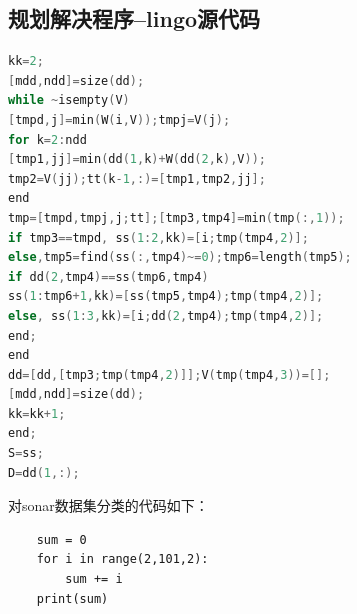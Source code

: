 \documentclass[fontset=windows]{whutmod}
\begin{document}
\subsection{规划解决程序--lingo源代码}
\begin{lstlisting}[language=c]
kk=2;
[mdd,ndd]=size(dd);
while ~isempty(V)
[tmpd,j]=min(W(i,V));tmpj=V(j);
for k=2:ndd
[tmp1,jj]=min(dd(1,k)+W(dd(2,k),V));
tmp2=V(jj);tt(k-1,:)=[tmp1,tmp2,jj];
end
tmp=[tmpd,tmpj,j;tt];[tmp3,tmp4]=min(tmp(:,1));
if tmp3==tmpd, ss(1:2,kk)=[i;tmp(tmp4,2)];
else,tmp5=find(ss(:,tmp4)~=0);tmp6=length(tmp5);
if dd(2,tmp4)==ss(tmp6,tmp4)
ss(1:tmp6+1,kk)=[ss(tmp5,tmp4);tmp(tmp4,2)];
else, ss(1:3,kk)=[i;dd(2,tmp4);tmp(tmp4,2)];
end;
end
dd=[dd,[tmp3;tmp(tmp4,2)]];V(tmp(tmp4,3))=[];
[mdd,ndd]=size(dd);
kk=kk+1;
end;
S=ss;
D=dd(1,:);
\end{lstlisting}


\lstset{language=python}

\noindent 对sonar数据集分类的代码如下： 
\begin{lstlisting}
	sum = 0
	for i in range(2,101,2):
	    sum += i
	print(sum)

\end{lstlisting}
\end{document}
